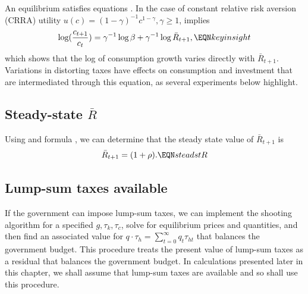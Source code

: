 An equilibrium satisfies equations . In the case of
 constant relative risk aversion (CRRA) utility $u(c) = (1-\gamma)^{-1}c^{1-\gamma}, \gamma \geq 1$,
 implies
$$  \log({c_{t+1}\over c_t}) = \gamma^{-1}\log \beta + \gamma^{-1}\log \bar R_{t+1}, \EQN keyinsight $$
which shows that the log of consumption growth varies directly
with $\bar R_{t+1}$.
Variations in distorting taxes have effects on consumption and
investment that are intermediated through this equation, as
several  experiments below  highlight.

\subsection{Steady-state $\bar R$}

Using  and formula , we can determine that the steady
state value of $\bar R_{t+1}$
is
$$ \bar R_{t+1} =  (1+\rho). \EQN steadstR $$

\subsection{Lump-sum taxes available}

If the government can  impose lump-sum taxes,  we
can implement the shooting algorithm for a specified $g, \tau_k,
 \tau_c$, solve for equilibrium prices and quantities,  and
then find an associated value for $q\cdot \tau_h =
 \sum_{t=0}^\infty q_t \tau_{ht}$   that balances the government budget.
This procedure treats
 the present value of lump-sum taxes as a residual that
balances the government budget.
In calculations presented later in this chapter,
we shall assume that lump-sum taxes are available and so shall use this
procedure.

